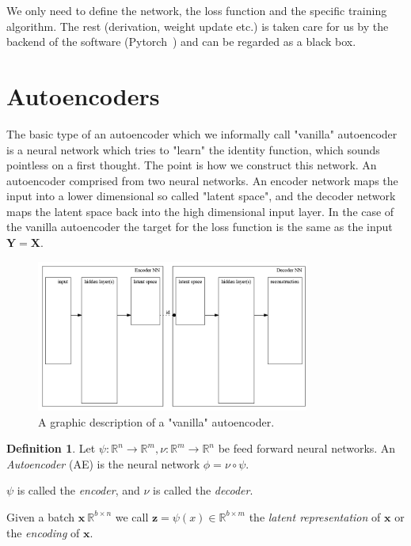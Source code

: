 \documentclass[11pt, a4paper]{report}
\theoremstyle{plain}
\theoremstyle{definition}
\newtheorem{mydef}{Definition}[chapter]
\theoremstyle{remark}
\newcommand{\R}{\mathbb{R}}
\newcommand{\X}{\mathbf{X}}
\newcommand{\x}{\mathbf{x}}
\newcommand{\z}{\mathbf{z}}
\newcommand{\Y}{\mathbf{Y}}
\begin{document}
We only need to define the network, the loss function and the specific training
algorithm. The rest (derivation, weight update etc.) is taken care for us by the
backend of the software (Pytorch~\cite{pytorch2018pytorch}) and can be regarded
as a black box.

\section{Autoencoders}

The basic type of an autoencoder which we informally call "vanilla" autoencoder
is a neural network which tries to "learn" the identity function, which sounds
pointless on a first thought. The point is how we construct this network. An
autoencoder comprised from two neural networks.
An encoder network maps the input into a lower dimensional so called "latent
space", and the decoder network maps the latent space back into the high
dimensional input layer.
In the case of the vanilla autoencoder the target for the loss function is the
same as the input $\Y = \X$.

\begin{figure}[!h]
\begin{framed}
\centering
\includegraphics[width=0.8\textwidth]{./images/models/autoencoderNN.gv.png}
\caption{
A graphic description of a "vanilla" autoencoder.
}
\label{fig:autoencoder}
\end{framed}
\end{figure}

\begin{mydef}
\label{def:autoencoder}
Let $\psi : \R^n \to \R^m, \nu : \R^m \to \R^n$ be feed forward neural networks.
An \textit{Autoencoder} (AE) is the neural network $\phi = \nu \circ \psi$.  

$\psi$ is called the \emph{encoder}, and $\nu$ is called the \emph{decoder}.

Given a batch $\x \ \R^{b \times n}$ we call $\z = \psi(x) \in \R^{b \times m}$
the \emph{latent representation} of $\x$ or the \emph{encoding} of $\x$.
\end{mydef}
\end{document}
